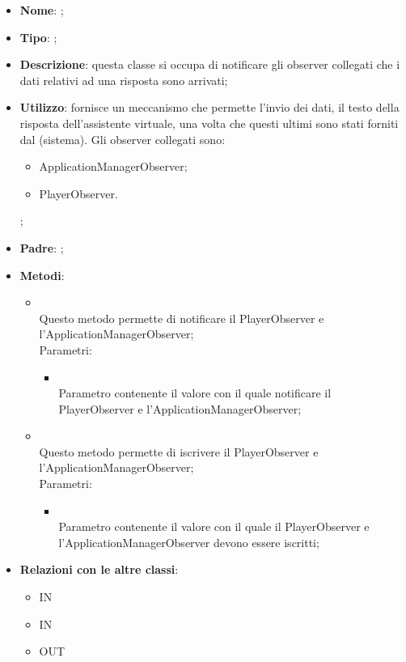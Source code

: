 \begin{itemize}
	\item \textbf{Nome}: ;
	\item \textbf{Tipo}: ;
	\item \textbf{Descrizione}: questa classe si occupa di notificare gli observer collegati che i dati relativi ad una risposta sono arrivati;
	\item \textbf{Utilizzo}: fornisce un meccanismo che permette l'invio dei dati, il testo della risposta dell'assistente virtuale, una volta che questi ultimi sono stati forniti dal (sistema).
Gli observer collegati sono:
\begin{itemize}
\item ApplicationManagerObserver;
\item PlayerObserver.
\end{itemize};
	\item \textbf{Padre}: ;
	\item \textbf{Metodi}:
	\begin{itemize}
		\item[]  \\
		Questo metodo permette di notificare il PlayerObserver e l'ApplicationManagerObserver;\\
		Parametri:
		\begin{itemize}
			\item {} \\
			Parametro contenente il valore con il quale notificare il PlayerObserver e l'ApplicationManagerObserver;
		\end{itemize}
		\item[]  \\
		Questo metodo permette di iscrivere il PlayerObserver e l'ApplicationManagerObserver;\\
		Parametri:
		\begin{itemize}
			\item {} \\
			Parametro contenente il valore con il quale il PlayerObserver e l'ApplicationManagerObserver devono essere iscritti;
		\end{itemize}
	\end{itemize}
	\item \textbf{Relazioni con le altre classi}:
	\begin{itemize}
		\item IN \hyperlink{DataArrivedObservable_label}{}
		\item IN \hyperlink{Logic_label}{}
		\item OUT \hyperlink{Logic_label}{}
	\end{itemize}
\end{itemize}

